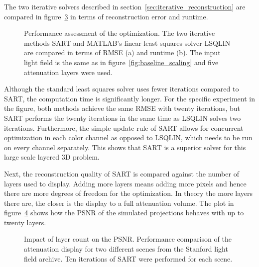 The two iterative solvers described in section~\ref{sec:iterative_reconstruction} are compared in figure~\ref{fig:sart_vs_lsqlin} in terms of reconstruction error and runtime.
\begin{figure}[tb]
	\begin{subfigure}{0.5\textwidth}
		\centering
		
		\caption{}
		\label{fig:sart_lsqlin_iterations_vs_rmse}
	\end{subfigure}%
	\begin{subfigure}{0.5\textwidth}
		\centering
		
		\caption{}
		\label{fig:sart_lsqlin_iterations_vs_time}
	\end{subfigure}%
	\caption[Performance assessment of the optimization]
			{Performance assessment of the optimization.
			 The two iterative methods \mbox{SART} and \mbox{MATLAB's} linear least squares solver LSQLIN are compared in terms of \mbox{RMSE} (a) and runtime (b).
			 The input light field is the same as in figure~\ref{fig:baseline_scaling} and five attenuation layers were used.}
	\label{fig:sart_vs_lsqlin}
\end{figure}
Although the standard least squares solver uses fewer iterations compared to SART, the computation time is significantly longer.
For the specific experiment in the figure, both methods achieve the same RMSE with twenty iterations, but SART performs the twenty iterations in the same time as LSQLIN solves two iterations.
Furthermore, the simple update rule of SART allows for concurrent optimization in each color channel as opposed to LSQLIN, which needs to be run on every channel separately.
This shows that SART is a superior solver for this large scale layered 3D problem.

Next, the reconstruction quality of SART is compared against the number of layers used to display.
Adding more layers means adding more pixels and hence there are more degrees of freedom for the optimization.
In theory the more layers there are, the closer is the display to a full attenuation volume.
The plot in figure~\ref{fig:sart_layers_vs_psnr} shows how the PSNR of the simulated projections behaves with up to twenty layers.
\begin{figure}[tb]
	\begin{subfigure}{\textwidth}
		\centering
		
	\end{subfigure}%
	\caption[Impact of layer count on \mbox{PSNR}]
			{Impact of layer count on the \mbox{PSNR}.
			 Performance comparison of the attenuation display for two different scenes from the Stanford light field archive.
			 Ten iterations of SART were performed for each scene.}
	\label{fig:sart_layers_vs_psnr}
\end{figure}

